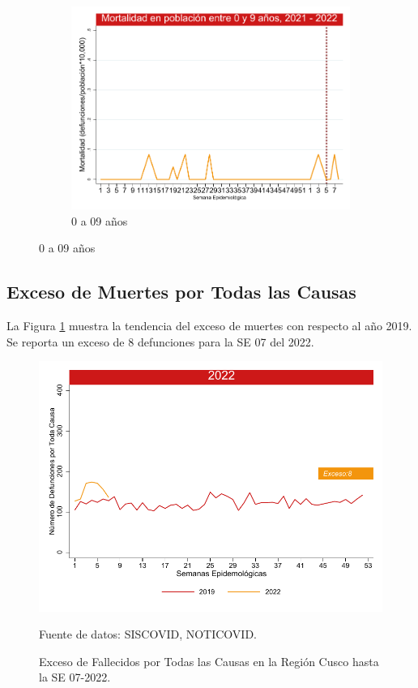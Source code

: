 \documentclass[12pt,a4paper,openany]{book}
\begin{document}
\begin{figure}[h]
	\vspace{10mm}
	\begin{subfigure}[b]{0.45\textwidth}
		\centering
		\includegraphics[width=\textwidth]{../figuras/mortalidad_edad_0.pdf}
		\caption{0 a 09 años}
	\end{subfigure}
\end{figure}
\clearpage	
	\subsection*{Exceso de Muertes por Todas las Causas}
\noindent La Figura \ref{fig:exceso_regional} muestra la tendencia del exceso de muertes con respecto al año 2019. Se reporta un exceso de 8 defunciones para la SE 07 del 2022.

	\begin{figure}[h]
	\caption{Exceso de Fallecidos por Todas las Causas en la Región Cusco hasta la SE 07-2022.}\label{fig:exceso_regional}
	\begin{center}
		\includegraphics[width=0.85\linewidth]{../figuras/exceso_region_2022.pdf}
	\end{center}
	{\footnotesize {Fuente de datos: SISCOVID, NOTICOVID.}}
	\end{figure}
\clearpage
\end{document}
